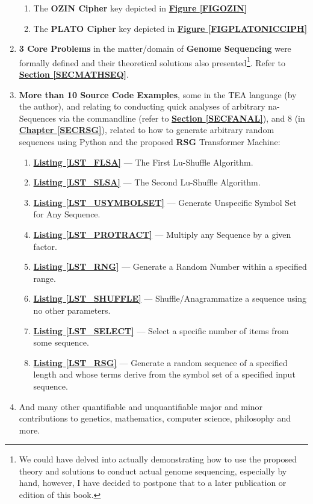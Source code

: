 \documentclass[a4paper, 18pt]{book} %
\begin{document}
\begin{enumerate}
{\begin{enumerate}
\item The \textbf{OZIN Cipher} key depicted in \textbf{\hyperref[FIGOZIN]{Figure \ref{FIGOZIN}}}
\item The \textbf{PLATO Cipher} key depicted in \textbf{\hyperref[FIGPLATONICCIPH]{Figure \ref{FIGPLATONICCIPH}}}
\end{enumerate}

}
\item \textbf{3 Core Problems} in the matter/domain of \textbf{Genome Sequencing} were formally defined and their theoretical solutions also presented\footnote{We could have delved into actually demonstrating how to use the proposed theory and solutions to conduct actual genome sequencing, especially by hand, however, I have decided to postpone that to a later publication or edition of this book.}. Refer to \textbf{\hyperref[SECMATHSEQ]{Section \ref{SECMATHSEQ}}}.

\item{ \textbf{More than 10 Source Code Examples}, some in the TEA language (by the author\cite{cli_tttt}), and relating to conducting quick analyses of arbitrary na-Sequences via the commandline (refer to \textbf{\hyperref[SECFANAL]{Section \ref{SECFANAL}}}), and 8 (in \textbf{\hyperref[SECRSG]{Chapter \ref{SECRSG}}}), related to how to generate arbitrary random sequences using Python and the proposed \textbf{RSG} Transformer Machine:

\begin{enumerate}
\item \textbf{\hyperref[LST_FLSA]{Listing \ref{LST_FLSA}}} --- The First Lu-Shuffle Algorithm.
\item \textbf{\hyperref[LST_SLSA]{Listing \ref{LST_SLSA}}} --- The Second  Lu-Shuffle Algorithm.
\item \textbf{\hyperref[LST_USYMBOLSET]{Listing \ref{LST_USYMBOLSET}}} --- Generate Unspecific Symbol Set for Any Sequence.
\item \textbf{\hyperref[LST_PROTRACT]{Listing \ref{LST_PROTRACT}}} --- Multiply any Sequence by a given factor.
\item \textbf{\hyperref[LST_RNG]{Listing \ref{LST_RNG}}} --- Generate a Random Number within a specified range.
\item \textbf{\hyperref[LST_SHUFFLE]{Listing \ref{LST_SHUFFLE}}} --- Shuffle/Anagrammatize a sequence using no other parameters.
\item \textbf{\hyperref[LST_SELECT]{Listing \ref{LST_SELECT}}} --- Select a specific number of items from some sequence.
\item \textbf{\hyperref[LST_RSG]{Listing \ref{LST_RSG}}} --- Generate a random sequence of a specified length and whose terms derive from the symbol set of a specified input sequence.
\end{enumerate}

}
\item And many other quantifiable and unquantifiable major and minor contributions to genetics, mathematics, computer science, philosophy and more.
\end{enumerate}
\end{document}
